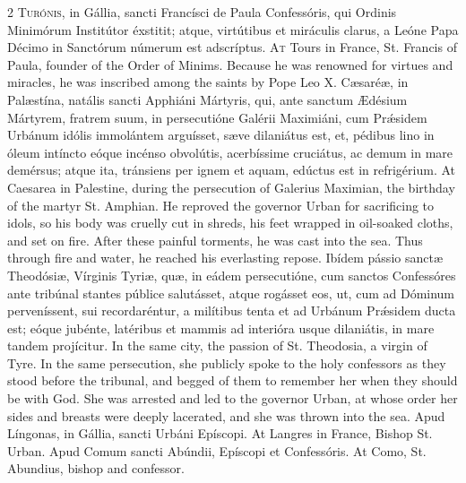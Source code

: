 \begin{paracol}{2}
\lettrine[lines=2]{T}{urónis,} in Gállia, sancti Francísci de Paula Confessóris, qui Ordinis 
 Minimórum Institútor éxstitit; atque, virtútibus et miráculis clarus, a 
 Leóne Papa Décimo in Sanctórum númerum est adscríptus.
\switchcolumn
{}
\lettrine[lines=2]{A}{t} Tours in France, St. Francis of Paula, founder of the Order of Minims. 
 Because he was renowned for virtues and miracles, he was inscribed among the 
 saints by Pope Leo X.
\switchcolumn*
{}
Cæsaréæ, in Palæstína, natális sancti Apphiáni 
 Mártyris, qui, ante sanctum Ædésium Mártyrem, fratrem suum, in persecutióne 
 Galérii Maximiáni, cum Prǽsidem Urbánum idólis immolántem arguísset, sæve 
 dilaniátus est, et, pédibus lino in óleum intíncto eóque incénso obvolútis, 
 acerbíssime cruciátus, ac demum in mare demérsus; atque ita, tránsiens per 
 ignem et aquam, edúctus est in refrigérium.
\switchcolumn
{}
At Caesarea in Palestine, during the persecution of Galerius Maximian, the 
 birthday of the martyr St. Amphian. He reproved the governor Urban for 
 sacrificing to idols, so his body was cruelly cut in shreds, his feet 
 wrapped in oil-soaked cloths, and set on fire. After these painful 
 torments, he was cast into the sea. Thus through fire and water, he 
 reached his everlasting repose.
\switchcolumn*
{}
Ibídem pássio sanctæ Theodósiæ, Vírginis Tyriæ, 
 quæ, in eádem persecutióne, cum sanctos Confessóres ante tribúnal stantes 
 públice salutásset, atque rogásset eos, ut, cum ad Dóminum perveníssent, sui 
 recordaréntur, a milítibus tenta et ad Urbánum Prǽsidem ducta est; eóque 
 jubénte, latéribus et mammis ad interióra usque dilaniátis, in mare tandem 
 projícitur.
\switchcolumn
{}
In the same city, the passion of St. Theodosia, a virgin of Tyre. In 
 the same persecution, she publicly spoke to the holy confessors as they 
 stood before the tribunal, and begged of them to remember her when they 
 should be with God. She was arrested and led to the governor Urban, at 
 whose order her sides and breasts were deeply lacerated, and she was thrown 
 into the sea.
\switchcolumn*
{}
Apud Língonas, in Gállia, sancti Urbáni 
 Epíscopi.
\switchcolumn
{}
At Langres in France, Bishop St. Urban.
\switchcolumn*
{}
Apud Comum sancti Abúndii, Epíscopi et Confessóris.
\switchcolumn
{}
At Como, St. Abundius, bishop and confessor.
\switchcolumn*

\end{paracol}
